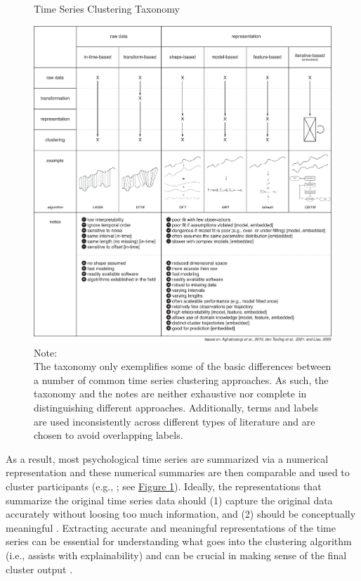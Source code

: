 \documentclass[man, 12pt, a4paper, mask, floatsintext]{apa7}
\theoremstyle{break}
\theoremstyle{plain}
\newcommand{\fgrref}[2][]{\hyperref[#2]{Figure \ref*{#2}#1}}
\begin{document}
\begin{figure}[!hbtp] %
  \caption{Time Series Clustering Taxonomy}
  \label{fig:tsClustTax}
  \centering\includegraphics[width=\textwidth]{figures/TS Cluster Flow/tsClustTax.pdf}
  \caption*{Note: \\
  The taxonomy only exemplifies some of the basic differences between a number of common time series clustering approaches. As such, the taxonomy and the notes are neither exhaustive nor complete in distinguishing different approaches. Additionally, terms and labels are used inconsistently across different types of literature and are chosen to avoid overlapping labels.}
\end{figure}

As a result, most psychological time series are summarized via a numerical representation and these numerical summaries are then comparable and used to cluster participants (e.g., \citealp[]{timmerman2013}; see \fgrref{fig:tsClustTax}). Ideally, the representations that summarize the original time series data should (1) capture the original data accurately without loosing too much information, and (2) should be conceptually meaningful \citep[e.g.,][]{vandermaaten2009}. Extracting accurate and meaningful representations of the time series can be essential for understanding what goes into the clustering algorithm (i.e., assists with explainability) and can be crucial in making sense of the final cluster output \citep[i.e., assists with interpretability; e.g.,][]{Kennedy2021}. 
\end{document}
